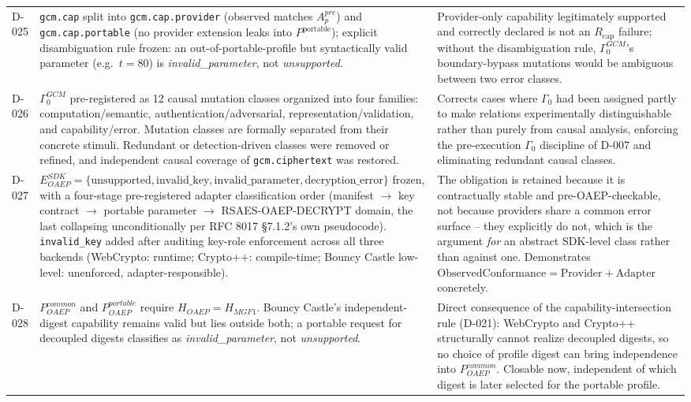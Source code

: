 \documentclass[11pt,a4paper]{article}
\begin{document}
\begin{longtable}{@{}L{0.28\textwidth}L{0.34\textwidth}L{0.30\textwidth}@{}}
D-025 & \texttt{gcm.cap} split into \texttt{gcm.cap.provider} (observed matches $A_p^{pre}$) and \texttt{gcm.cap.portable} (no provider extension leaks into $P^{\text{portable}}$); explicit disambiguation rule frozen: an out-of-portable-profile but syntactically valid parameter (e.g.\ $t=80$) is \emph{invalid\_parameter}, not \emph{unsupported}. & Provider-only capability legitimately supported and correctly declared is not an $R_{\text{cap}}$ failure; without the disambiguation rule, $\Gamma_0^{GCM}$'s boundary-bypass mutations would be ambiguous between two error classes.\\
D-026 & $\Gamma_0^{GCM}$ pre-registered as 12 causal mutation classes organized into four families: computation/semantic, authentication/adversarial, representation/validation, and capability/error. Mutation classes are formally separated from their concrete stimuli. Redundant or detection-driven classes were removed or refined, and independent causal coverage of \texttt{gcm.ciphertext} was restored. & Corrects cases where $\Gamma_0$ had been assigned partly to make relations experimentally distinguishable rather than purely from causal analysis, enforcing the pre-execution $\Gamma_0$ discipline of D-007 and eliminating redundant causal classes.\\
D-027 & $E_{OAEP}^{SDK} = \{\text{unsupported}, \text{invalid\_key}, \text{invalid\_parameter}, \text{decryption\_error}\}$ frozen, with a four-stage pre-registered adapter classification order (manifest $\to$ key contract $\to$ portable parameter $\to$ RSAES-OAEP-DECRYPT domain, the last collapsing unconditionally per RFC 8017 \S7.1.2's own pseudocode). \texttt{invalid\_key} added after auditing key-role enforcement across all three backends (WebCrypto: runtime; Crypto++: compile-time; Bouncy Castle low-level: unenforced, adapter-responsible). & The obligation is retained because it is contractually stable and pre-OAEP-checkable, not because providers share a common error surface -- they explicitly do not, which is the argument \emph{for} an abstract SDK-level class rather than against one. Demonstrates $\text{ObservedConformance} = \text{Provider} + \text{Adapter}$ concretely.\\
D-028 & $P_{OAEP}^{common}$ and $P_{OAEP}^{portable}$ require $H_{OAEP}=H_{MGF1}$. Bouncy Castle's independent-digest capability remains valid but lies outside both; a portable request for decoupled digests classifies as \emph{invalid\_parameter}, not \emph{unsupported}. & Direct consequence of the capability-intersection rule (D-021): WebCrypto and Crypto++ structurally cannot realize decoupled digests, so no choice of profile digest can bring independence into $P_{OAEP}^{common}$. Closable now, independent of which digest is later selected for the portable profile.\\

\end{longtable}
\end{document}

